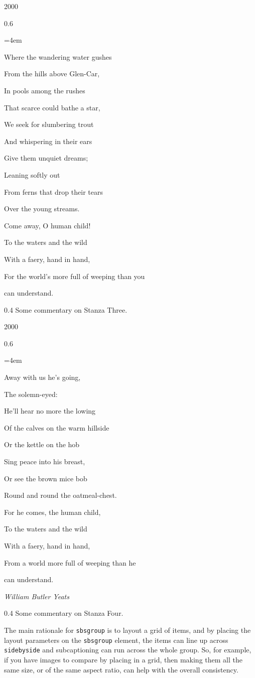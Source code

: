 \documentclass{sn-jnl}
\theoremstyle{thmstyleone}%
\theoremstyle{thmstyletwo}%
\theoremstyle{thmstylethree}%
\newcommand{\mono}[1]{\texttt{#1}}
\numberwithin{equation}{section}
\newenvironment{poem}{\setlength{\parindent}{0em}}{}
\newcommand{\poemTitle}[1]{\begin{center}\large\textbf{#1}\end{center}}
\newenvironment{stanza}{\vspace{0.25 em}\hangindent=4em}{\vspace{1 em}}
\newcommand{\poemauthorleft}[1]{\vspace{-1em}\begin{flushleft}\textit{#1}\end{flushleft}}
\newcommand{\poemlineleft}[1]{{\raggedright{#1}\par}\vspace{-\parskip}}
\begin{document}
\begin{sidebyside}{2}{0}{0}{0}%
\begin{sbspanel}{0.6}%
\begin{poem}%
\poemTitle{}
\begin{stanza}
\poemlineleft{Where the wandering water gushes}
\poemlineleft{From the hills above Glen-Car,}
\poemlineleft{In pools among the rushes}
\poemlineleft{That scarce could bathe a star,}
\poemlineleft{We seek for slumbering trout}
\poemlineleft{And whispering in their ears}
\poemlineleft{Give them unquiet dreams;}
\poemlineleft{Leaning softly out}
\poemlineleft{From ferns that drop their tears}
\poemlineleft{Over the young streams.}
\poemlineleft{Come away, O human child!}
\poemlineleft{To the waters and the wild}
\poemlineleft{With a faery, hand in hand,}
\poemlineleft{For the world's more full of weeping than you}
\poemlineleft{can understand.}
\end{stanza}
\end{poem}
\end{sbspanel}%
\begin{sbspanel}{0.4}%
Some commentary on Stanza Three.%
\end{sbspanel}%
\end{sidebyside}%
\begin{sidebyside}{2}{0}{0}{0}%
\begin{sbspanel}{0.6}%
\begin{poem}%
\poemTitle{}
\begin{stanza}
\poemlineleft{Away with us he's going,}
\poemlineleft{The solemn-eyed:}
\poemlineleft{He'll hear no more the lowing}
\poemlineleft{Of the calves on the warm hillside}
\poemlineleft{Or the kettle on the hob}
\poemlineleft{Sing peace into his breast,}
\poemlineleft{Or see the brown mice bob}
\poemlineleft{Round and round the oatmeal-chest.}
\poemlineleft{For he comes, the human child,}
\poemlineleft{To the waters and the wild}
\poemlineleft{With a faery, hand in hand,}
\poemlineleft{From a world more full of weeping than he}
\poemlineleft{can understand.}
\end{stanza}
\poemauthorleft{William Butler Yeats}
\end{poem}
\end{sbspanel}%
\begin{sbspanel}{0.4}%
Some commentary on Stanza Four.%
\end{sbspanel}%
\end{sidebyside}%
The main rationale for \mono{sbsgroup} is to layout a grid of items, and by placing the layout parameters on the \mono{sbsgroup} element, the items can line up across \mono{sidebyside} and subcaptioning can run across the whole group.  So, for example, if you have images to compare by placing in a grid, then making them all the same size, or of the same aspect ratio, can help with the overall consistency.%
\end{document}
